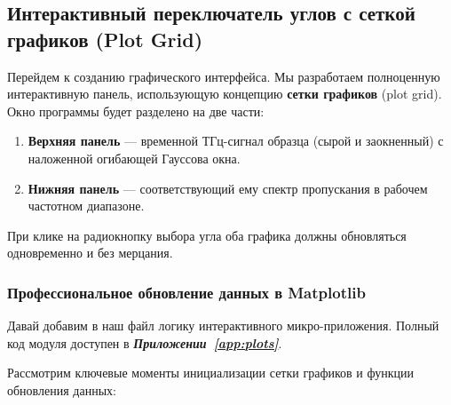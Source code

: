 
\subsection{Интерактивный переключатель углов с сеткой графиков (Plot Grid)}

Перейдем к созданию графического интерфейса. Мы разработаем полноценную интерактивную панель, использующую концепцию \textbf{сетки графиков} (plot grid). Окно программы будет разделено на две части:
\begin{enumerate}
    \item \textbf{Верхняя панель} — временной ТГц-сигнал образца (сырой и заокненный) с наложенной огибающей Гауссова окна.
    \item \textbf{Нижняя панель} — соответствующий ему спектр пропускания в рабочем частотном диапазоне.
\end{enumerate}

При клике на радиокнопку выбора угла оба графика должны обновляться одновременно и без мерцания.

\subsubsection{Профессиональное обновление данных в Matplotlib}


Давай добавим в наш файл  логику интерактивного микро-приложения. Полный код модуля доступен в \textbf{\textit{Приложении~\ref{app:plots}}}.

Рассмотрим ключевые моменты инициализации сетки графиков и функции обновления данных:

